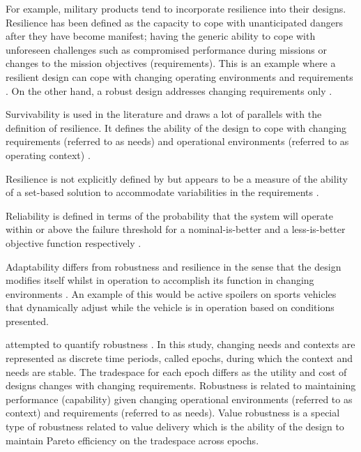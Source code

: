 For example, military products tend to incorporate resilience into their designs. Resilience has been defined as the capacity to cope with unanticipated dangers after they have become manifest; having the generic ability to cope with unforeseen challenges such as compromised performance during missions or changes to the mission objectives (requirements). This is an example where a resilient design can cope with changing operating environments and requirements \cite{Chalupnik2013,Small2019}. On the other hand, a robust design addresses changing requirements only \cite{Chalupnik2013}.

Survivability is used in the literature and draws a lot of parallels with the definition of resilience. It defines the ability of the design to cope with changing requirements (referred to as needs) and operational environments (referred to as operating context) \cite{McManus2007}.

Resilience is not explicitly defined by \citeauthor{Rehn2018} but appears to be a measure of the ability of a set-based solution to accommodate variabilities in the requirements \cite{Rehn2018}.

Reliability is defined in terms of the probability that the system will operate within or above the failure threshold for a nominal-is-better and a less-is-better objective function respectively \cite{Chalupnik2013}. 

Adaptability differs from robustness and resilience in the sense that the design modifies itself whilst in operation to accomplish its function in changing environments \cite{Chalupnik2013}. An example of this would be active spoilers on sports vehicles that dynamically adjust while the vehicle is in operation based on conditions presented.

\citeauthor{McManus2007} attempted to quantify robustness \cite{McManus2007}. In this study, changing needs and contexts are represented as discrete time periods, called epochs, during which the context and needs are stable. The tradespace for each epoch differs as the utility and cost of designs changes with changing requirements. Robustness is related to maintaining performance (capability) given changing operational environments (referred to as context) and requirements (referred to as needs). Value robustness is a special type of robustness related to value delivery which is the ability of the design to maintain Pareto efficiency on the tradespace across epochs.

